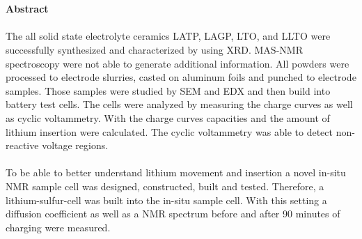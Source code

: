 \documentclass[a4paper, 11pt, headsepline,footsepline,twoside,abstract]{scrbook}
\begin{document}
\\\\
\textbf{\Large{Abstract}}
\\\\
The all solid state electrolyte ceramics LATP, LAGP, LTO, and LLTO were successfully synthesized and characterized by using XRD. MAS-NMR spectroscopy were not able to generate additional information. All powders were processed to electrode slurries, casted on aluminum foils and punched to electrode samples. Those samples were studied by SEM and EDX and then build into battery test cells. The cells were analyzed by measuring the charge curves as well as cyclic voltammetry. With the charge curves capacities and the amount of lithium insertion were calculated. The cyclic voltammetry was able to detect non-reactive voltage regions.
\\\\
To be able to better understand lithium movement and insertion a novel in-situ NMR sample cell was designed, constructed, built and tested. Therefore, a lithium-sulfur-cell was built into the in-situ sample cell. With this setting a diffusion coefficient as well as a NMR spectrum before and after 90 minutes of charging were measured. 
\pagestyle{toc}
\renewcommand*{\chapterpagestyle}{toc} %
\tableofcontents
{} 
\newpage
\cleardoubleemptypage
\pagestyle{normal}
\renewcommand*{\chapterpagestyle}{plain}
\setcounter{page}{1}
\end{document}
